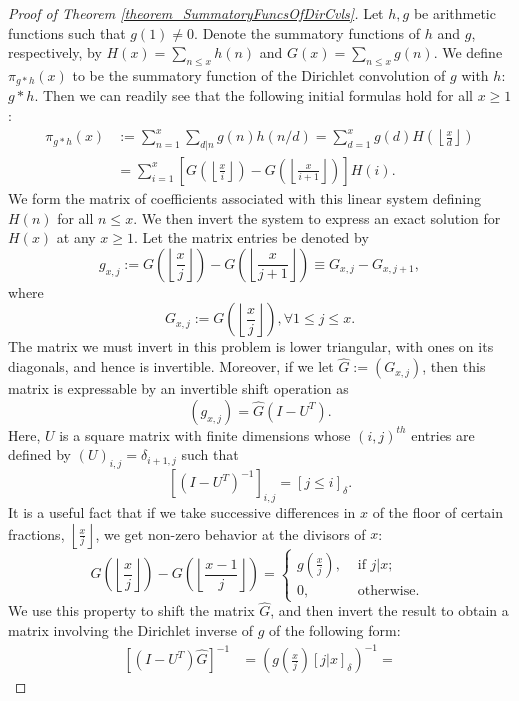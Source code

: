 \documentclass[11pt,reqno,a4letter]{article}
\numberwithin{figure}{section}
\numberwithin{table}{section}
\newcommand{\Iverson}[1]{\ensuremath{\left[#1\right]_{\delta}}}
\newcommand{\floor}[1]{\left\lfloor #1 \right\rfloor}
\newcommand{\Floor}[2]{\ensuremath{\left\lfloor \frac{#1}{#2} \right\rfloor}}
\theoremstyle{plain}
\numberwithin{theorem}{section}
\theoremstyle{definition}
\begin{document}
\begin{proof}[Proof of Theorem \ref{theorem_SummatoryFuncsOfDirCvls}] 
\label{proofOf_theorem_SummatoryFuncsOfDirCvls} 
Let $h,g$ be arithmetic functions such that $g(1) \neq 0$. 
Denote the summatory functions of $h$ and $g$, 
respectively, by $H(x) = \sum_{n \leq x} h(n)$ and $G(x) = \sum_{n \leq x} g(n)$. 
We define $\pi_{g \ast h}(x)$ to be the summatory function of the 
Dirichlet convolution of $g$ with $h$: $g \ast h$. 
Then we can readily see that the following initial formulas hold for all $x \geq 1$: 
\begin{align*} 
\pi_{g \ast h}(x) & := \sum_{n=1}^{x} \sum_{d|n} g(n) h(n/d) = \sum_{d=1}^x g(d) H\left(\floor{\frac{x}{d}}\right) \\ 
     & = \sum_{i=1}^x \left[G\left(\floor{\frac{x}{i}}\right) - G\left(\floor{\frac{x}{i+1}}\right)\right] H(i). 
\end{align*} 
We form the matrix of coefficients associated with this linear system defining $H(n)$ for all $n \leq x$. 
We then invert the system to express an 
exact solution for $H(x)$ at any $x \geq 1$. 
Let the matrix entries be denoted by 
\[
g_{x,j} := G\left(\floor{\frac{x}{j}}\right) - G\left(\floor{\frac{x}{j+1}}\right) \equiv G_{x,j} - G_{x,j+1}, 
\] 
where 
\[
G_{x,j} := G\left(\Floor{x}{j}\right), \forall 1 \leq j \leq x. 
\]
The matrix we must invert in this problem is lower triangular, with ones on its diagonals, and hence is invertible. 
Moreover, if we let $\hat{G} := (G_{x,j})$, then this matrix is 
expressable by an invertible shift operation as 
\[
(g_{x,j}) = \hat{G} (I - U^{T}). 
\]
Here, $U$ is a square matrix with finite dimensions 
whose $(i,j)^{th}$ entries are defined by $(U)_{i,j} = \delta_{i+1,j}$ such that 
\[
\left[(I - U^T)^{-1}\right]_{i,j} = \Iverson{j \leq i}. 
\]
It is a useful fact that if we take successive differences in $x$ of the 
floor of certain fractions, $\Floor{x}{j}$, we get non-zero behavior at the 
divisors of $x$: 
\[
G\left(\floor{\frac{x}{j}}\right) - G\left(\floor{\frac{x-1}{j}}\right) = 
     \begin{cases} 
     g\left(\frac{x}{j}\right), & \text{ if $j | x$; } \\ 
     0, & \text{ otherwise. } 
     \end{cases}
\]
We use this property to shift the matrix $\hat{G}$, and then invert the result to obtain a matrix involving the 
Dirichlet inverse of $g$ of the following form: 
\begin{align*} 
\left[(I-U^{T}) \hat{G}\right]^{-1} & = \left(g\left(\frac{x}{j}\right) \Iverson{j|x}\right)^{-1} = 

\end{align*}
\end{proof}
\end{document}
